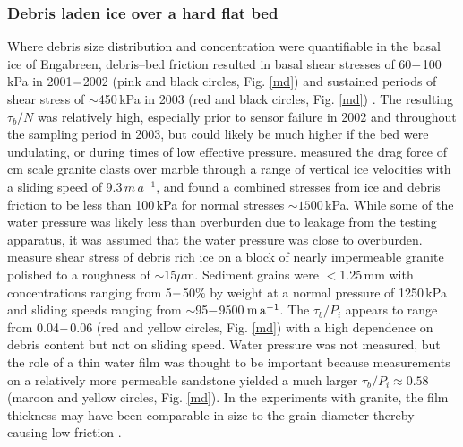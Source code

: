 \documentclass[review]{igs}
\begin{document}
\subsubsection{Debris laden ice over a hard flat bed}
Where debris size distribution and concentration were quantifiable in the basal ice of Engabreen, debris--bed friction resulted in basal shear stresses of 60$\--$100\,kPa in 2001$\--$2002 (pink and black circles, Fig. \ref{md}) \citep{Iverson2003} and sustained periods of shear stress of $\sim$450\,kPa in 2003 (red and black circles, Fig. \ref{md}) \citep{Cohen2005}. The resulting $\tau_b/N$ was relatively high, especially prior to sensor failure in 2002 and throughout the sampling period in 2003, but could likely be much higher if the bed were undulating, or during times of low effective pressure. \cite{Iverson1990} measured the drag force of cm scale granite clasts over marble through a range of vertical ice velocities with a sliding speed of 9.3$\,m\,a^{-1}$, and found a combined stresses from ice and debris friction to be less than 100\,kPa for normal stresses $\sim1500$\,kPa. While some of the water pressure was likely less than overburden due to leakage from the testing apparatus, it was assumed that the water pressure was close to overburden. \cite{Zoet2013a} measure shear stress of debris rich ice on a block of nearly impermeable granite polished to a roughness of $\sim15\mu$m. Sediment grains were $<$1.25\,mm with concentrations ranging from 5$\--$50\% by weight at a normal pressure of 1250\,kPa and sliding speeds ranging from $\sim$95$\--$9500$\rm\,m\,a^{-1}$. The $\tau_b/P_i$ appears to range from 0.04$\--$0.06 (red and yellow circles, Fig. \ref{md}) with a high dependence on debris content but not on sliding speed. Water pressure was not measured, but the role of a thin water film was thought to be important because measurements on a relatively more permeable sandstone yielded a much larger $\tau_b/P_i\approx0.58$ (maroon and yellow circles, Fig. \ref{md}). In the experiments with granite, the film thickness may have been comparable in size to the grain diameter thereby causing low friction \citep[e.g.][]{Cohen2005}. 
\end{document}
